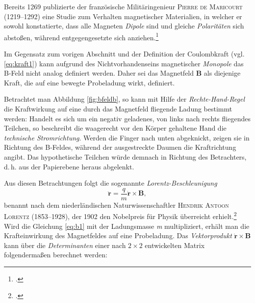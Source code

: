 \noindent Bereits 1269 publizierte der französische Militäringenieur \textsc{Pierre de Maricourt} (1219--1292) eine Studie zum Verhalten magnetischer Materialien, in welcher er sowohl konstatierte, dass alle Magneten \textit{Dipole} sind und gleiche \textit{Polaritäten} sich abstoßen, während entgegengesetzte sich anziehen.\vspace*{1.8cm}\footcite[vgl.][S.\,35-36]{Schiller32016}\vspace*{-1.8cm}\par
Im Gegensatz zum vorigen Abschnitt und der Definition der Coulombkraft (vgl. \eqref{eq:kraft1}) kann aufgrund des Nichtvorhandenseins ma{\-}gnetisch{\-}er \textit{Monopole} das B-Feld nicht analog definiert werden. Daher sei das
Magnetfeld $\boldsymbol{B}$ als diejenige Kraft, die auf eine bewegte Probeladung wirkt, definiert.\vspace*{0.2cm}\vspace*{-0.2cm}\par 
Betrachtet man Abbildung \ref{fig:bfeldb}, so kann mit Hilfe der \textit{Rechte-Hand-Regel} die Kraftwirkung auf eine durch das Magnetfeld fliegende Ladung bestimmt werden: Handelt es sich um ein negativ geladenes, von links nach rechts fliegendes Teilchen, so beschreibt die waagerecht vor den Körper gehaltene Hand die \textit{technische Stromrichtung}. Werden die Finger nach unten abgeknickt, zeigen sie in Richtung des B-Feldes, während der ausgestreckte Daumen die Kraftrichtung angibt. Das hypothetische Teilchen würde demnach in Richtung des Betrachters, d.\,h. aus der Papierebene heraus abgelenkt. 

Aus diesen Betrachtungen folgt die sogenannte \textit{Lorentz-Beschleunigung}
\begin{equation}
\label{eq:b1}
\boldsymbol{\ddot{r}}=\frac{q}{m}\boldsymbol{\dot{r}}\times\boldsymbol{B}, 
\end{equation}
benannt nach dem niederländischen Naturwissenschaftler \textsc{Hendrik Antoon Lorentz} (1853--1928), der 1902 den Nobelpreis für Physik überreicht erhielt.\footcite[vgl.][S.\,45]{Schiller32016} Wird die Gleichung \eqref{eq:b1} mit der Ladungsmasse \textit{m} multipliziert, erhält man die Krafteinwirkung des Magnetfeldes auf eine Probeladung. Das \textit{Vektorprodukt} $\boldsymbol{\dot{r}}\times \boldsymbol{B}$ kann über die \textit{Determinanten} einer nach $2\times 2$ entwickelten Matrix folgendermaßen berechnet werden:

